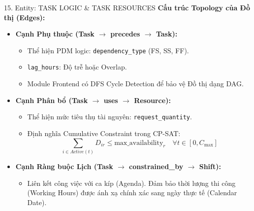 \begin{frame}{15. Entity: TASK LOGIC \& TASK RESOURCES}
    \textbf{Cấu trúc Topology của Đồ thị (Edges):}
    \vspace{0.2cm}
    \begin{itemize}
        \item \textbf{Cạnh Phụ thuộc (Task $\rightarrow$ precedes $\rightarrow$ Task):}
        \begin{itemize}
            \item Thể hiện PDM logic: \texttt{dependency\_type} (FS, SS, FF).
            \item \texttt{lag\_hours}: Độ trễ hoặc Overlap.
            \item Module Frontend có DFS Cycle Detection để bảo vệ Đồ thị dạng DAG.
        \end{itemize}
        \vspace{0.1cm}
        \item \textbf{Cạnh Phân bổ (Task $\rightarrow$ uses $\rightarrow$ Resource):}
        \begin{itemize}
            \item Thể hiện mức tiêu thụ tài nguyên: \texttt{request\_quantity}.
            \item Định nghĩa Cumulative Constraint trong CP-SAT:
            $$\sum_{i \in Active(t)} D_{ir} \leq \text{max\_availability}_r \quad \forall t \in [0, C_{\max}]$$
        \end{itemize}
        \vspace{0.1cm}
        \item \textbf{Cạnh Ràng buộc Lịch (Task $\rightarrow$ constrained\_by $\rightarrow$ Shift):}
        \begin{itemize}
            \item Liên kết công việc với ca kíp (Agenda). Đảm bảo thời lượng thi công (Working Hours) được ánh xạ chính xác sang ngày thực tế (Calendar Date).
        \end{itemize}
    \end{itemize}
\end{frame}
